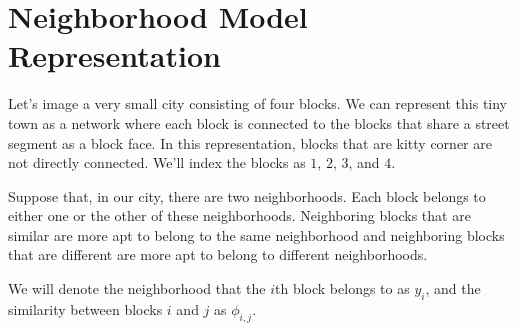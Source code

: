 \section*{Neighborhood Model Representation}
Let's image a very small city consisting of four blocks. We can
represent this tiny town as a network where each block is connected
to the blocks that share a street segment as a block face. In this
representation, blocks that are kitty corner are not directly
connected. We'll index the blocks as $1$, $2$, $3$, and $4$.

\begin{figure}
\centering
{}
\end{figure}

\begin{figure}
\centering


\end{figure}

Suppose that, in our city, there are two neighborhoods. Each block
belongs to either one or the other of these neighborhoods. Neighboring
blocks that are similar are more apt to belong to the same
neighborhood and neighboring blocks that are different are more apt to
belong to different neighborhoods.

We will denote the neighborhood that the $i$th block belongs to as
$y_i$, and the similarity between blocks $i$ and $j$ as $\phi_{i,j}$.

\begin{figure}[!h]
\centering


\end{figure}


